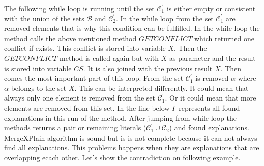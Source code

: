 \documentclass[12pt,a4paper]{article}
\begin{document}
The following while loop is running until the set $\mathcal{C}^{\prime}_{1}$ is either empty or consistent with the union of the sets $\mathcal{B}$ and $\mathcal{C}^{\prime}_{2}$. In the while loop from the set $\mathcal{C}^{\prime}_{1}$ are removed elements that is why this condition can be fulfilled. In the while loop the method calls the above mentioned method $\mathit{GETCONFLICT}$ which returned one conflict if exists. This conflict is stored into variable $X$. Then the $\mathit{GETCONFLICT}$ method is called again but with $X$ as parameter and the result is stored into variable $CS$. It is also joined with the previous result $X$. Then comes the most important part of this loop. From the set $\mathcal{C}^{\prime}_{1}$ is removed $\alpha$ where $\alpha$ belongs to the set $X$. This can be interpreted differently. It could mean that always only one element is removed from the set $\mathcal{C}^{\prime}_{1}$. Or it could mean that more elements are removed from this set. In the line below $\Gamma$ represents all found explanations in this run of the method. After jumping from while loop the methods returns a pair or remaining literals ($\mathcal{C}^{\prime}_{1} \cup \mathcal{C}^{\prime}_{2}$) and found explanations.
MergeXPlain algorithm is sound but is is not complete because it can not always find all explanations. This problems happens when they are explanations that are overlapping ecach other. Let's show the contradiction on following example.
\end{document}
